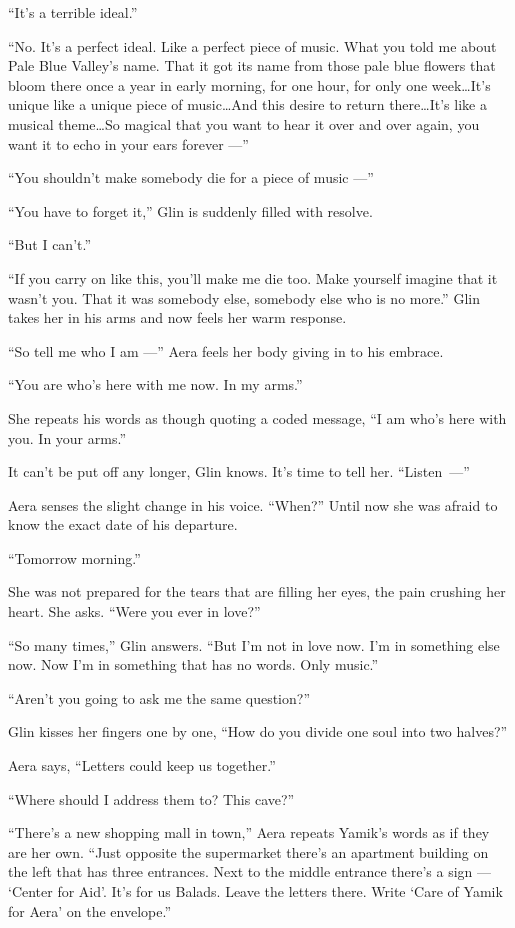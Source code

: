 \documentclass[twoside,11pt,openany]{book}
\begin{document}
``It's a terrible ideal.''

``No. It's a perfect ideal. Like a perfect piece of music.
What you told me about Pale Blue Valley{'}s name. That it got its name from those pale blue flowers that bloom there once a year in early morning, for one hour, for only one week{\ldots}It's unique like a unique piece of
music{\ldots}And this desire to return there{\ldots}It's
like a musical theme{\ldots}So magical that you want to hear it over and over again, you want it to echo in your
ears forever ---''

``You shouldn't make somebody die for a piece of music ---''

``You have to forget it,'' Glin is suddenly filled with resolve.

``But I can't.''

``If you carry on like this, you'll make me die too.
Make{ }yourself{ }imagine that it wasn't you. That it was somebody else, somebody else
who is no more.'' Glin takes her in his arms and now feels her warm response.

``So tell me who I am ---'' Aera feels her body giving in to his embrace.

``You are who's here with me now. In my arms.''

She repeats his words as though quoting a coded message, ``I am who's here with you. In your
arms.''

It can't be put off any longer, Glin knows. It's time to tell her.
\hbox{``Listen ---''}

Aera senses the slight change in his voice. ``When?'' Until now she was afraid to know the
exact date of his departure.

``Tomorrow morning.''

She was not prepared for the tears that are filling her eyes, the pain crushing her heart. She asks. ``Were
you ever in love?''

``So many times,'' Glin answers. ``But I'm not in love now. I'm in something else
now. Now I'm in something that has no words. Only music.''

``Aren't you going to ask me the same question?''

Glin kisses her fingers one by one, ``How do you divide one soul into two halves?''

Aera says, ``Letters could keep us together.''

``Where should I address them to? This cave?''

``There's a new shopping mall in town,'' Aera repeats Yamik's words as if they are her own.
``Just opposite the supermarket there's an apartment building on the left that has three entrances. Next
to the middle entrance there's a sign --- `Center for Aid'. It's for us Balads. Leave the letters there. Write `Care of
Yamik for Aera' on the envelope.''
\end{document}
